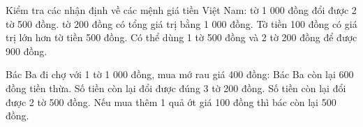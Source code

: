 \begin{ex} %
Kiểm tra các nhận định về các mệnh giá tiền Việt Nam:
\choiceTF
{ tờ 1 000 đồng đổi được 2 tờ 500 đồng.}
{ tờ 200 đồng có tổng giá trị bằng 1 000 đồng.}
{Tờ tiền 100 đồng có giá trị lớn hơn tờ tiền 500 đồng.}
{\True Có thể dùng 1 tờ 500 đồng và 2 tờ 200 đồng để được 900 đồng.}
\end{ex}

\begin{ex} %
Bác Ba đi chợ với 1 tờ 1 000 đồng, mua mớ rau giá 400 đồng:
\choiceTF
{\True Bác Ba còn lại 600 đồng tiền thừa.}
{\True Số tiền còn lại đổi được đúng 3 tờ 200 đồng.}
{Số tiền còn lại đổi được 2 tờ 500 đồng.}
{\True Nếu mua thêm 1 quả ớt giá 100 đồng thì bác còn lại 500 đồng.}
\end{ex}

